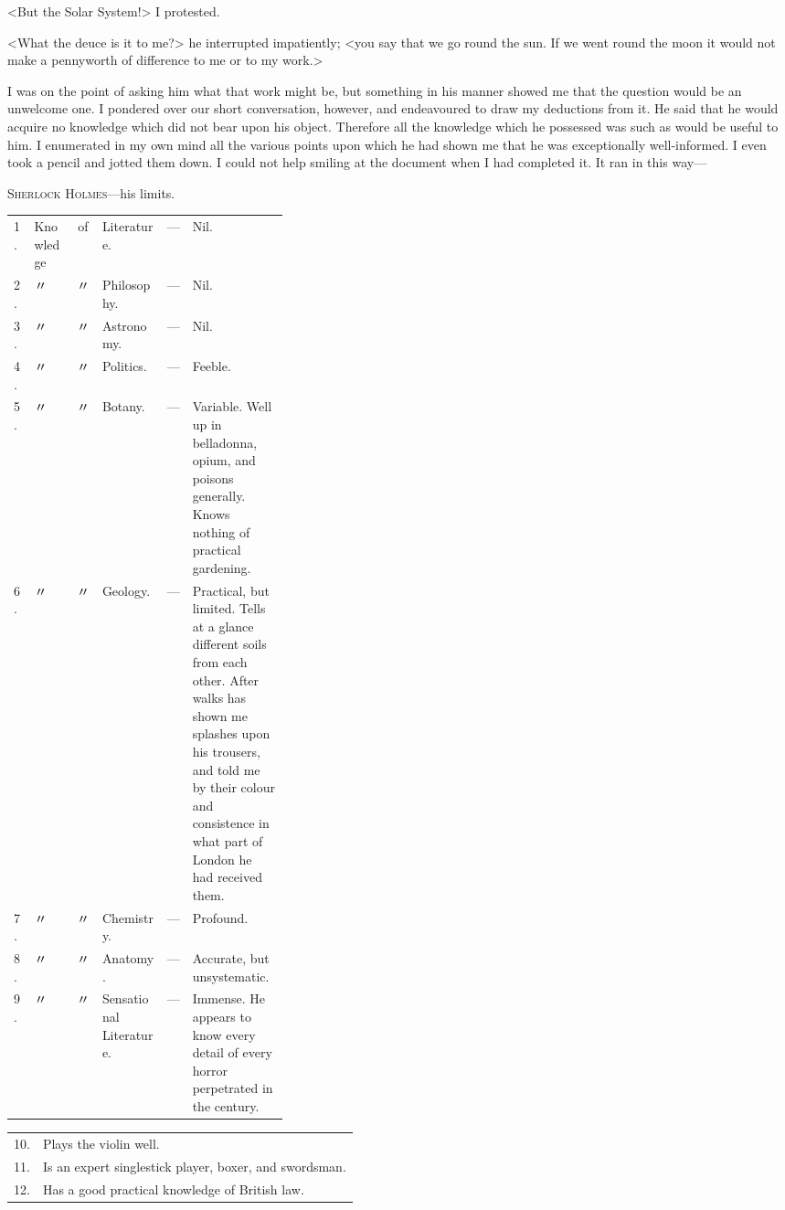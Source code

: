 <But the Solar System!> I protested.

<What the deuce is it to me?> he interrupted impatiently; <you say that we go round the sun. If we went round the moon it would not make a pennyworth of difference to me or to my work.>

I was on the point of asking him what that work might be, but something in his manner showed me that the question would be an unwelcome one. I pondered over our short conversation, however, and endeavoured to draw my deductions from it. He said that he would acquire no knowledge which did not bear upon his object. Therefore all the knowledge which he possessed was such as would be useful to him. I enumerated in my own mind all the various points upon which he had shown me that he was exceptionally well-informed. I even took a pencil and jotted them down. I could not help smiling at the document when I had completed it. It ran in this way—

\begin{center}
	{\Large\textsc{Sherlock Holmes}—his limits.}
\vspace{0.5em}

\begin{tabularx}{\linewidth}{l X c X c p{0.35\linewidth}}
1.&Knowledge&of&Literature.&—&Nil.\\
2.&〃&〃&Philosophy.&—&Nil.\\
3.&〃&〃&Astronomy.&—&Nil.\\
4.&〃&〃&Politics.&—&Feeble.\\
5.&〃&〃&Botany.&—&Variable. Well up in belladonna, opium, and poisons generally. Knows nothing of practical gardening.\\
6.&〃&〃&Geology.&—&Practical, but limited. Tells at a glance different soils from each other. After walks has shown me splashes upon his trousers, and told me by their colour and consistence in what part of London he had received them.\\
7.&〃&〃&Chemistry.&—&Profound.\\
8.&〃&〃&Anatomy.&—&Accurate, but unsystematic.\\
9.&〃&〃&Sensational Literature.&—&Immense. He appears to know every detail of every horror perpetrated in the century.\\
\end{tabularx}
\begin{tabularx}{\linewidth}{l l}
10.&Plays the violin well.\\
11.&Is an expert singlestick player, boxer, and swordsman.\\
12.&Has a good practical knowledge of British law.
\end{tabularx}
\end{center}

